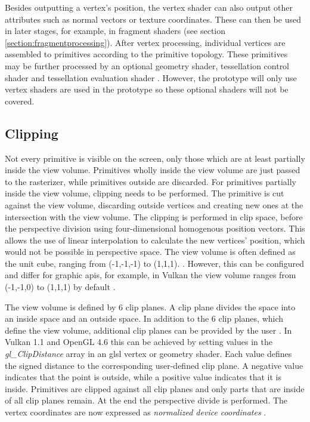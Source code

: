 Besides outputting a vertex's position, the vertex shader can also output other attributes such as normal vectors or texture coordinates. These can then be used in later stages, for example, in fragment shaders (see section \ref{section:fragmentprocessing}). After vertex processing, individual vertices are assembled to primitives according to the primitive topology. These primitives may be further processed by an optional geometry shader, tessellation control shader and tessellation evaluation shader \cite{akine:2018:realtime, khronos:vulkan:spec1.1}. However, the prototype will only use vertex shaders are used in the prototype so these optional shaders will not be covered.


\subsection{Clipping}
\label{section:clipping}

Not every primitive is visible on the screen, only those which are at least partially inside the view volume. Primitives wholly inside the view volume are just passed to the rasterizer, while primitives outside are discarded. For primitives partially inside the view volume, clipping needs to be performed. The primitive is cut against the view volume, discarding outside vertices and creating new ones at the intersection with the view volume. The clipping is performed in clip space, before the perspective division using four-dimensional homogenous position vectors. This allows the use of linear interpolation to calculate the new vertices' position, which would not be possible in perspective space. The view volume is often defined as the unit cube, ranging from (-1,-1,-1) to (1,1,1).
\cite{akine:2018:realtime}. However, this can be configured and differ for graphic \glspl{api}, for example, in Vulkan the view volume ranges from (-1,-1,0) to (1,1,1) by default \cite{khronos:glsl4.60:spec}.

The view volume is defined by 6 clip planes. A clip plane divides the space into an inside space and an outside space.
In addition to the 6 clip planes, which define the view volume, additional clip planes can be provided by the user \cite{akine:2018:realtime}. In Vulkan 1.1 and OpenGL 4.6 this can be achieved by setting values in the \textit{gl\_ClipDistance} array in an \gls{glsl} vertex or geometry shader. Each value defines the signed distance to the corresponding user-defined clip plane. A negative value indicates that the point is outside, while a positive value indicates that it is inside. Primitives are clipped against all clip planes and only parts that are inside of all clip planes remain. At the end the perspective divide is performed. The vertex coordinates are now expressed as \textit{normalized device coordinates} \cite{khronos:vulkan:spec1.1, khronos:openGL:spec4.6}.

